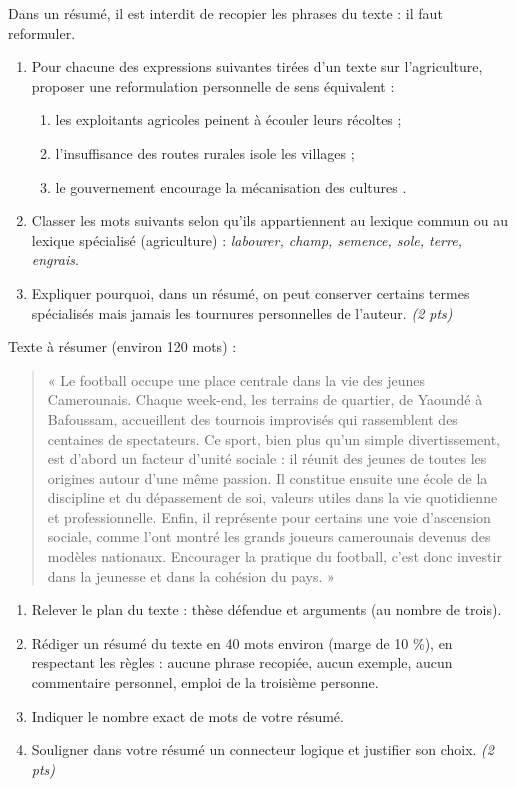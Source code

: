 \documentclass[11pt]{article}
\begin{document}
\begin{exercice}
Dans un résumé, il est interdit de recopier les phrases du texte : il faut reformuler.

\begin{enumerate}
\item Pour chacune des expressions suivantes tirées d'un texte sur l'agriculture, proposer une reformulation personnelle de sens équivalent :
\begin{enumerate}
\item[a)] \og les exploitants agricoles peinent à écouler leurs récoltes \fg ;
\item[b)] \og l'insuffisance des routes rurales isole les villages \fg ;
\item[c)] \og le gouvernement encourage la mécanisation des cultures \fg.
\end{enumerate}
\item Classer les mots suivants selon qu'ils appartiennent au lexique commun ou au lexique spécialisé (agriculture) : \textit{labourer, champ, semence, sole, terre, engrais}.
\item Expliquer pourquoi, dans un résumé, on peut conserver certains termes spécialisés mais jamais les tournures personnelles de l'auteur. \textit{(2 pts)}
\end{enumerate}
\end{exercice}

\begin{exercice}
Texte à résumer (environ 120 mots) :

\begin{quote}
« Le football occupe une place centrale dans la vie des jeunes Camerounais. Chaque week-end, les terrains de quartier, de Yaoundé à Bafoussam, accueillent des tournois improvisés qui rassemblent des centaines de spectateurs. Ce sport, bien plus qu'un simple divertissement, est d'abord un facteur d'unité sociale : il réunit des jeunes de toutes les origines autour d'une même passion. Il constitue ensuite une école de la discipline et du dépassement de soi, valeurs utiles dans la vie quotidienne et professionnelle. Enfin, il représente pour certains une voie d'ascension sociale, comme l'ont montré les grands joueurs camerounais devenus des modèles nationaux. Encourager la pratique du football, c'est donc investir dans la jeunesse et dans la cohésion du pays. »
\end{quote}

\begin{enumerate}
\item Relever le plan du texte : thèse défendue et arguments (au nombre de trois).
\item Rédiger un résumé du texte en 40 mots environ (marge de 10 \%), en respectant les règles : aucune phrase recopiée, aucun exemple, aucun commentaire personnel, emploi de la troisième personne.
\item Indiquer le nombre exact de mots de votre résumé.
\item Souligner dans votre résumé un connecteur logique et justifier son choix. \textit{(2 pts)}
\end{enumerate}
\end{exercice}
\end{document}
